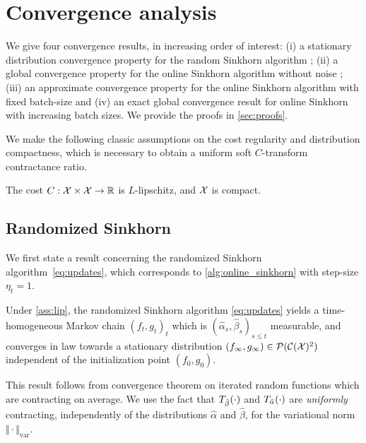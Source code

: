 

\section{Convergence analysis}\label{sec:analysis}

We give four convergence results, in increasing order of interest: (i) a stationary distribution
convergence property for the random Sinkhorn algorithm ; (ii) a global
convergence property for the online Sinkhorn algorithm without noise ; (iii) an
approximate convergence property for the online Sinkhorn algorithm with fixed
batch-size and (iv) an exact global convergence result for online Sinkhorn
with increasing batch sizes. We provide the proofs in \autoref{sec:proofs}.

We make the following classic assumptions on the cost regularity and
distribution compactness, which is necessary to obtain a uniform
soft $C$-transform contractance ratio.

\begin{assumption}\label{ass:lip}
    The cost $C: \mathcal{X} \times \mathcal{X} \to \mathbb{R}$ is $L$-lipschitz, and $\mathcal{X}$ is  compact.
\end{assumption}

\subsection{Randomized Sinkhorn}

We first state a result concerning the randomized Sinkhorn algorithm~\eqref{eq:updates}, which corresponds to
\autoref{alg:online_sinkhorn} with step-size $\eta_t = 1$.

\begin{proposition}\label{prop:markov}
    Under \autoref{ass:lip}, the randomized Sinkhorn algorithm \eqref{eq:updates} yields a time-homogeneous
    Markov chain ${(f_t, g_t)}_t$ which is $(\hat \alpha_s, \hat \beta_s)_{s \leq
    t}$ measurable, and converges in law towards a stationary distribution
    $(f_\infty, g_\infty) \in \mathcal{P}(\mathcal{C}(\mathcal{X})^2)$ independent of the initialization
    point $(f_0, g_0)$.
\end{proposition}

This result follows from \citet{diaconis_iterated} convergence theorem on
iterated random functions which are contracting on average. We use the
fact that $T_{\hat \beta}(\cdot)$ and $T_{\hat \alpha}(\cdot)$ are
\textit{uniformly} contracting, independently of the distributions $\hat \alpha$ and
$\hat \beta$, for the variational norm $\Vert \cdot \Vert_{\text{var}}$.

